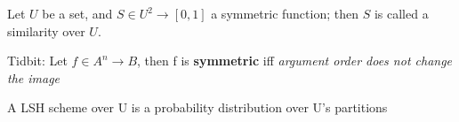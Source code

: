 	Let $U$ be a set, and $S \in U^2 \to [0, 1]$ a symmetric function; then $S$ is called a similarity over $U$.
	
	Tidbit: Let $f \in A^n \to B$, then f is \textbf{symmetric} iff \textit{argument order does not change the image} %
	
	A LSH scheme over U is a probability distribution over U's partitions
	
	
	
	
	
	
	
	
	
	
	
	
	
	
	
